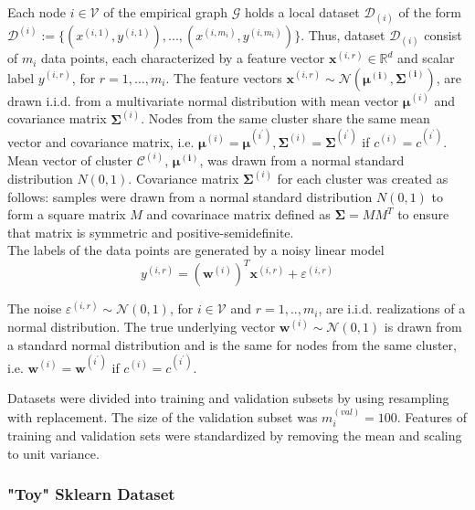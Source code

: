 \documentclass{article}
\begin{document}
Each node $i \in \mathcal {V}$ of the empirical graph $\mathcal {G}$ holds a local dataset $\mathcal {D}_{(i)}$ of the form $\mathcal {D}^{(i)} := \{ ({x}^{(i,1)}, {y}^{(i,1)}), ..., ({x}^{(i,{m}_{i})}, {y}^{(i,{m}_{i})}) \}$. Thus, dataset $\mathcal {D}_{(i)}$ consist of ${m}_{i}$ data points, each characterized by a feature vector $\mathbf{x}^{(i,r)} \in \mathbb{R}^{d}$ and scalar label ${y}^{(i,r)}$, for $r=1,...,{m}_{i}$. The feature vectors $\mathbf{x}^{(i,r)} \sim \mathcal{N}(\mathbf{{\mu}^{(i)}},\mathbf{{\Sigma}^{(i)}})$, are drawn i.i.d. from a multivariate normal distribution with mean vector $\mathbf{\mu}^{(i)}$ and covariance matrix $\mathbf{\Sigma}^{(i)}$. 
Nodes from the same cluster share the same mean vector and covariance matrix, i.e. $\mathbf{\mu}^{(i)} = \mathbf{\mu}^{({i}^{'})}, \mathbf{\Sigma}^{(i)} = \mathbf{\Sigma}^{({i}^{'})}$ if ${c}^{(i)}={c}^{({i}^{'})}$.\\
Mean vector of cluster $\mathcal{C}^{(i)}$, $\mathbf{{\mu}^{(i)}}$, was drawn from a normal standard distribution $N(0,1)$.
Covariance matrix $\mathbf{\Sigma}^{(i)}$ for each cluster was created as follows: samples were drawn from a normal standard distribution $N(0,1)$ to form a square matrix $M$ and covarinace matrix defined as $\mathbf{\Sigma} = M{M}^{T}$ to ensure that matrix is symmetric and positive-semidefinite.\\
The labels of the data points are generated by a noisy linear model
\begin{equation}
{y}^{(i,r)} = (\mathbf{w}^{(i)})^T\mathbf{x}^{(i,r)} + {\varepsilon}^{(i,r)}
\end{equation}

The noise ${\varepsilon}^{(i,r)} \sim \mathcal{N}(0, 1)$, for $i \in \mathcal{V}$ and $r=1,..,{m}_{i}$, are i.i.d. realizations of a normal distribution. The true underlying vector $\mathbf{w}^{(i)} \sim \mathcal{N}(0,1)$ is drawn from a standard normal distribution and is the same for nodes from the same cluster, i.e. $\mathbf{w}^{(i)}=\mathbf{w}^{({i}^{'})}$ if ${c}^{(i)}={c}^{({i}^{'})}$.

Datasets were divided into training and validation subsets by using resampling with replacement. The size of the validation subset was ${m}^{(val)}_{i}=100$. Features of training and validation sets were standardized by removing the mean and scaling to unit variance.

\subsubsection{"Toy" Sklearn Dataset}
\end{document}
